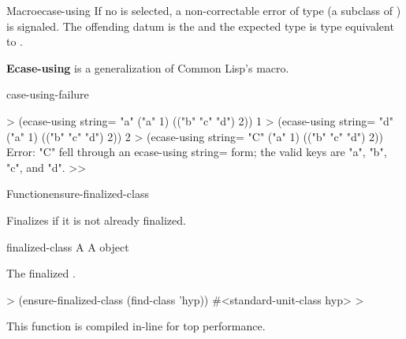 \documentclass[10pt,twoside,english,pdftex]{article}
\newcommand{\inline}{This function is compiled in-line for top performance.}
\begin{document}
\begin{functiondoc}{Macro}{ecase-using}{%
    }
%
%
%
If no  is selected, a non-correctable error of type
 (a subclass of ) is
signaled. The offending datum is the  and the expected
type is type equivalent to .

\textbf{Ecase-using} is a generalization of Common Lisp's 
macro.

\begin{alsos}{case-using-failure}
\end{alsos}

\fnexamples
%
\W\supp
\begin{example}
  > (ecase-using string= "a"
      ("a" 1)
      (("b" "c" "d") 2))
  1
  > (ecase-using string= "d"
      ("a" 1)
      (("b" "c" "d") 2))
  2\goodpagebreak
  > (ecase-using string= "C"
      ("a" 1)
      (("b" "c" "d") 2))
  Error: "C" fell through an ecase-using string= form; 
         the valid keys are "a", "b", "c", and "d".
  >>
\end{example}

\end{functiondoc}


\begin{functiondoc}{Function}{ensure-finalized-class}{ 
    }
%
%

\fnsyntax

\fnpurpose Finalizes  if it is not already finalized.

\fnpackage {}

\fnmodule {}

\fnargs
\begin{args}{finalized-class}
\arg[class] A 
 A  object
\end{args}

\fnreturns The finalized .

\fnexample
%
\W\supp
\begin{example}
  > (ensure-finalized-class (find-class 'hyp))
  #<standard-unit-class hyp>
  >
\end{example}

\fnnote \inline

\end{functiondoc}
\end{document}
